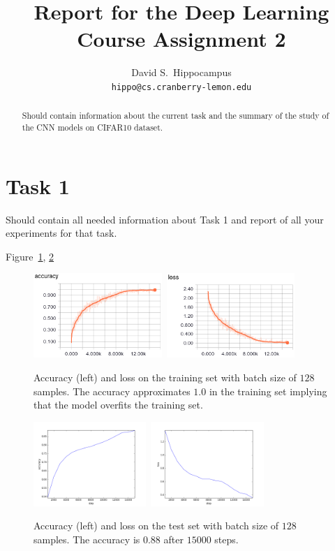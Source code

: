 \documentclass{article}
\title{Report for the Deep Learning Course Assignment 2 }
\author{
  David S.~Hippocampus \\
  \texttt{hippo@cs.cranberry-lemon.edu}
}
\begin{document}

\maketitle

\begin{abstract}
Should contain information about the current task and the summary of the study of the CNN models on CIFAR10 dataset.

\end{abstract}

\section{Task 1}
Should contain all needed information about Task 1 and report of all your experiments for that task.

Figure~\ref{fig:1}, \ref{fig:2}


\begin{figure}[h!]
\centering
\includegraphics[height=3.2cm]{acc1.png}\	
\includegraphics[height=3.2cm]{loss1.png}
\caption{Accuracy (left) and loss on the training set with batch size of $128$ samples. The accuracy approximates $1.0$ in the training set implying that the model overfits the training set.}
\label{fig:1}
\end{figure}


\begin{figure}[h!]
\centering
\includegraphics[height=3.2cm]{acc2.png}\	
\includegraphics[height=3.2cm]{loss2.png}
\caption{Accuracy (left) and loss on the test set with batch size of $128$ samples. The accuracy is $0.88$ after $15000$ steps.}
\label{fig:2}
\end{figure}
\end{document}
